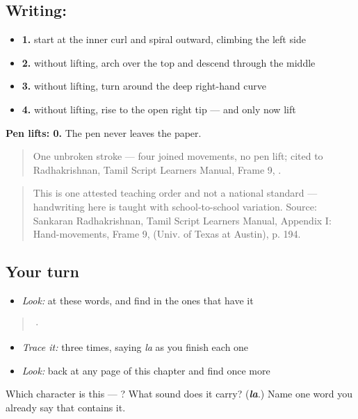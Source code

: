 \subsection*{Writing: }

\begin{itemize}
\raggedright
  \item \textbf{1.} start at the inner curl and spiral outward, climbing the left side
  \item \textbf{2.} without lifting, arch over the top and descend through the middle
  \item \textbf{3.} without lifting, turn around the deep right-hand curve
  \item \textbf{4.} without lifting, rise to the open right tip — and only now lift
\end{itemize}

\textbf{Pen lifts: 0.} The pen never leaves the paper.

\begin{quote}
One unbroken stroke — four joined movements, no pen lift; cited to Radhakrishnan, Tamil Script Learners Manual, Frame 9, .
\end{quote}

\begin{quote}
This is one attested teaching order and not a national standard — handwriting here is taught with school-to-school variation. Source: Sankaran Radhakrishnan, Tamil Script Learners Manual, Appendix I: Hand-movements, Frame 9,  (Univ. of Texas at Austin), p. 194.
\end{quote}

\subsection*{Your turn}
\begin{itemize}
\raggedright
  \item \emph{Look:} at these words, and find  in the ones that have it
\end{itemize}

\begin{quote}
  ·  
\end{quote}

\begin{itemize}
\raggedright
  \item \emph{Trace it:}  three times, saying \emph{la} as you finish each one
  \item \emph{Look:} back at any page of this chapter and find  once more
\end{itemize}

\begin{tcolorbox}[breakable,colback=teal!4,colframe=teal!35!black,title={Before you move on}]
Which character is this — ? What sound does it carry? (\emph{\textbf{la}}.) Name one word you already say that contains it.
\end{tcolorbox}
